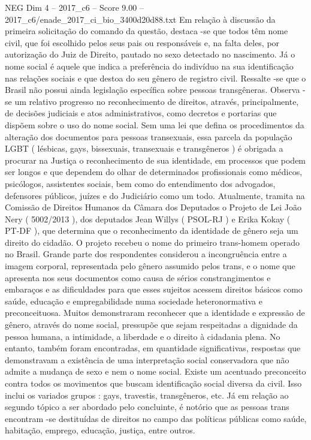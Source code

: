 \begin{textsample}{NEG Dim 4 – 2017\_c6 – Score 9.00 – 2017\_c6/enade\_2017\_ci\_bio\_3400d20d88.txt}
Em relação à discussão da primeira solicitação do comando da questão, destaca -se que todos têm nome civil, que foi escolhido pelos seus pais ou responsáveis e, na falta deles, por autorização do Juiz de Direito, pautado no sexo detectado no nascimento.
Já o nome social é aquele que indica a preferência do indivíduo na sua identificação nas relações sociais e que destoa do seu gênero de registro civil.
Ressalte -se que o Brasil não possui ainda legislação específica sobre pessoas transgêneras.
Observa -se um relativo progresso no reconhecimento de direitos, através, principalmente, de decisões judiciais e atos administrativos, como decretos e portarias que dispõem sobre o uso do nome social.
Sem uma lei que defina os procedimentos da alteração dos documentos para pessoas transexuais, essa parcela da população LGBT ( lésbicas, gays, bissexuais, transexuais e transgêneros ) é obrigada a procurar na Justiça o reconhecimento de sua identidade, em processos que podem ser longos e que dependem do olhar de determinados profissionais como médicos, psicólogos, assistentes sociais, bem como do entendimento dos advogados, defensores públicos, juízes e do Judiciário como um todo.
Atualmente, tramita na Comissão de Direitos Humanos da Câmara dos Deputados o Projeto de Lei João Nery ( 5002/2013 ), dos deputados Jean Willys ( PSOL-RJ ) e Erika Kokay ( PT-DF ), que determina que o reconhecimento da identidade de gênero seja um direito do cidadão.
O projeto recebeu o nome do primeiro trans-homem operado no Brasil.
Grande parte dos respondentes considerou a incongruência entre a imagem corporal, representada pelo gênero assumido pelos trans, e o nome que apresenta nos seus documentos como causa de sérios constrangimentos e embaraços e as dificuldades para que esses sujeitos acessem direitos básicos como saúde, educação e empregabilidade numa sociedade heteronormativa e preconceituosa.
Muitos demonstraram reconhecer que a identidade e expressão de gênero, através do nome social, pressupõe que sejam respeitadas a dignidade da pessoa humana, a intimidade, a liberdade e o direito à cidadania plena.
No entanto, também foram encontradas, em quantidade significativas, respostas que demonstravam a existência de uma interpretação social conservadora que não admite a mudança de sexo e nem o nome social.
Existe um acentuado preconceito contra todos os movimentos que buscam identificação social diversa da civil.
Isso inclui os variados grupos : gays, travestis, transgêneros, etc.
Já em relação ao segundo tópico a ser abordado pelo concluinte, é notório que as pessoas trans encontram -se destituídas de direitos no campo das políticas públicas como saúde, habitação, emprego, educação, justiça, entre outros.

\end{textsample}
